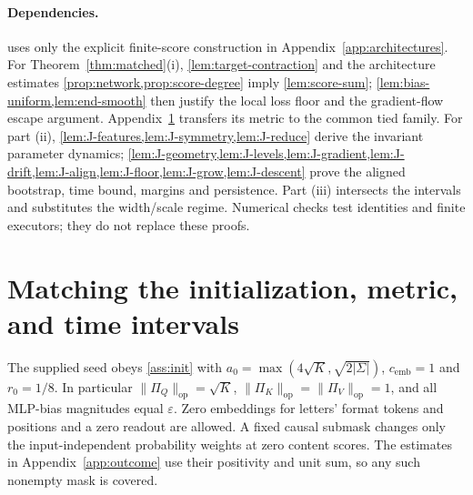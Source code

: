 \paragraph{Dependencies.}
 uses only the explicit finite-score construction in Appendix~\ref{app:architectures}. For Theorem~\ref{thm:matched}(i), \cref{lem:target-contraction} and the architecture estimates \cref{prop:network,prop:score-degree} imply \cref{lem:score-sum}; \cref{lem:bias-uniform,lem:end-smooth} then justify the local loss floor and the gradient-flow escape argument. Appendix~\ref{app:match} transfers its metric to the common tied family. For part (ii), \cref{lem:J-features,lem:J-symmetry,lem:J-reduce} derive the invariant parameter dynamics; \cref{lem:J-geometry,lem:J-levels,lem:J-gradient,lem:J-drift,lem:J-align,lem:J-floor,lem:J-grow,lem:J-descent} prove the aligned bootstrap, time bound, margins and persistence. Part (iii) intersects the intervals and substitutes the width/scale regime. Numerical checks test identities and finite executors; they do not replace these proofs.





\section{Matching the initialization, metric, and time intervals}\label{app:match}
The supplied seed obeys \cref{ass:init} with $a_0=\max(4\sqrt K,\sqrt{2|\Sigma|})$, $c_{\mathrm{emb}}=1$ and $r_0=1/8$. In particular $\|\Pi_Q\|_{\mathrm{op}}=\sqrt K$, $\|\Pi_K\|_{\mathrm{op}}=\|\Pi_V\|_{\mathrm{op}}=1$, and all MLP-bias magnitudes equal $\varepsilon$. Zero embeddings for letters' format tokens and positions and a zero readout are allowed. A fixed causal submask changes only the input-independent probability weights at zero content scores. The estimates in Appendix~\ref{app:outcome} use their positivity and unit sum, so any such nonempty mask is covered.


